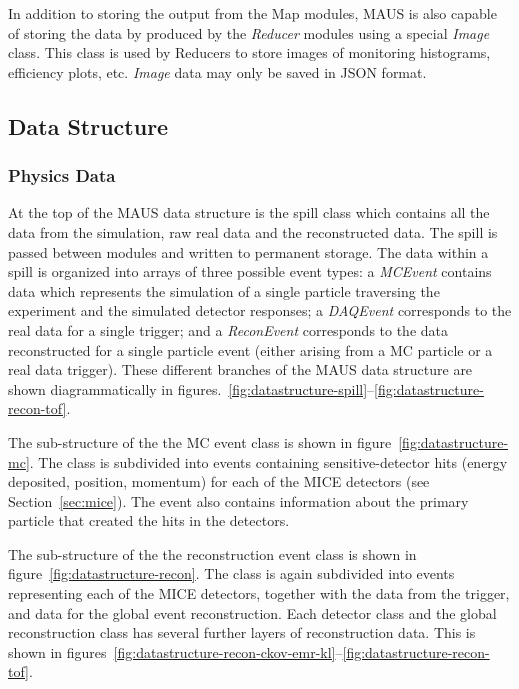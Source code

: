 \documentclass{JINST}
\begin{document}
In addition to storing the output from the Map modules, MAUS is also capable of storing the data by produced by the \emph{Reducer} modules using a special \emph{Image} class. This class is used by Reducers to store images of monitoring histograms, efficiency plots, etc. \emph{Image} data may only be saved in JSON format.

%
\subsection{Data Structure}\label{sec:maus-datastr}

\subsubsection{Physics Data} \label{sec:physics-datastr}

At the top of the MAUS data structure is the spill class which contains all the data from the simulation, raw real data and the reconstructed data. The spill is passed between modules and written to permanent storage. The data within a spill is organized into arrays of three possible event types: a \emph{MCEvent} contains data which represents the simulation of a single particle traversing the experiment and the simulated detector responses; a \emph{DAQEvent} corresponds to the real data for a single trigger; and a \emph{ReconEvent} corresponds to the data reconstructed for a single particle event (either arising from a MC particle or a real data trigger). These different branches of the MAUS data structure are shown diagrammatically in figures.~\ref{fig:datastructure-spill}--\ref{fig:datastructure-recon-tof}.

The sub-structure of the the MC event class is shown in figure~\ref{fig:datastructure-mc}. The class is subdivided into events containing sensitive-detector hits (energy deposited, position, momentum) for each of the MICE detectors (see Section~\ref{sec:mice}). The event also contains information about the primary particle that created the hits in the detectors.

The sub-structure of the the reconstruction event class is shown in figure~\ref{fig:datastructure-recon}. The class is again subdivided into events representing each of the MICE detectors, together with the data from the trigger, and data for the global event reconstruction. Each detector class and the global reconstruction class has several further layers of reconstruction data. This is shown in figures~\ref{fig:datastructure-recon-ckov-emr-kl}--\ref{fig:datastructure-recon-tof}.
\end{document}
